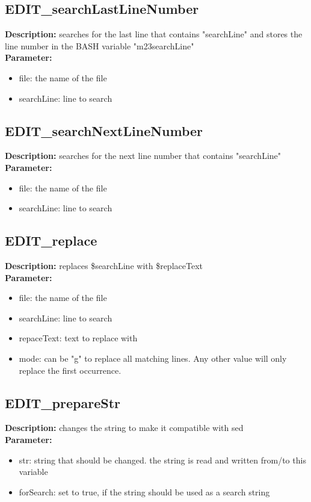 \subsection{EDIT\_searchLastLineNumber}
\textbf{Description:} searches for the last line that contains "searchLine" and stores the line number in the BASH variable "m23searchLine"\\
\textbf{Parameter:}
\begin{itemize}
\item file: the name of the file
\item searchLine: line to search
\end{itemize}

\subsection{EDIT\_searchNextLineNumber}
\textbf{Description:} searches for the next line number that contains "searchLine"\\
\textbf{Parameter:}
\begin{itemize}
\item file: the name of the file
\item searchLine: line to search
\end{itemize}

\subsection{EDIT\_replace}
\textbf{Description:} replaces \$searchLine with \$replaceText\\
\textbf{Parameter:}
\begin{itemize}
\item file: the name of the file
\item searchLine: line to search
\item repaceText: text to replace with
\item mode: can be "g" to replace all matching lines. Any other value will only replace the first occurrence.
\end{itemize}

\subsection{EDIT\_prepareStr}
\textbf{Description:} changes the string to make it compatible with sed\\
\textbf{Parameter:}
\begin{itemize}
\item str: string that should be changed. the string is read and written from/to this variable
\item forSearch: set to true, if the string should be used as a search string
\end{itemize}

